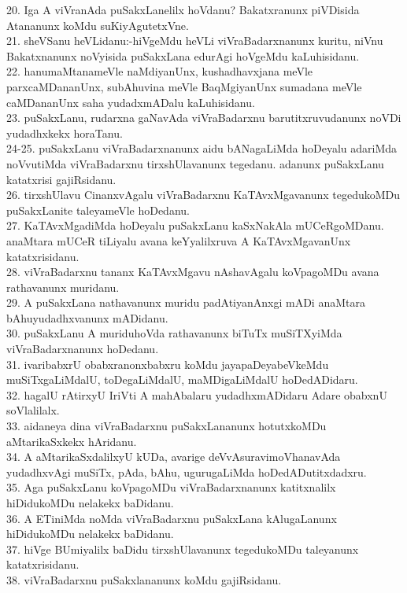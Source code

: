 \documentclass{article}
\begin{document}
20. Iga A viVranAda puSakxLanelilx hoVdanu? Bakatxranunx piVDisida Atananunx koMdu suKiyAgutetxVne.\\
21. sheVSanu heVLidanu:-hiVgeMdu heVLi viVraBadarxnanunx kuritu, niVnu Bakatxnanunx noVyisida puSakxLana edurAgi hoVgeMdu kaLuhisidanu.\\
22. hanumaMtanameVle naMdiyanUnx, kushadhavxjana meVle parxcaMDananUnx, subAhuvina meVle BaqMgiyanUnx sumadana meVle caMDananUnx saha yudadxmADalu kaLuhisidanu.\\
23. puSakxLanu, rudarxna gaNavAda viVraBadarxnu barutitxruvudanunx noVDi yudadhxkekx horaTanu.\\
24-25. puSakxLanu viVraBadarxnanunx aidu bANagaLiMda hoDeyalu adariMda noVvutiMda viVraBadarxnu tirxshUlavanunx tegedanu. adanunx puSakxLanu katatxrisi gajiRsidanu.\\
26. tirxshUlavu CinanxvAgalu viVraBadarxnu KaTAvxMgavanunx tegedukoMDu puSakxLanite taleyameVle hoDedanu.\\
27. KaTAvxMgadiMda hoDeyalu puSakxLanu kaSxNakAla mUCeRgoMDanu. anaMtara mUCeR tiLiyalu avana keYyalilxruva A KaTAvxMgavanUnx katatxrisidanu.\\
28. viVraBadarxnu tananx KaTAvxMgavu nAshavAgalu koVpagoMDu avana rathavanunx muridanu.\\
29. A puSakxLana nathavanunx muridu padAtiyanAnxgi mADi anaMtara bAhuyudadhxvanunx mADidanu.\\
30. puSakxLanu A muriduhoVda rathavanunx biTuTx muSiTXyiMda viVraBadarxnanunx hoDedanu.\\
31. ivaribabxrU obabxranonxbabxru koMdu jayapaDeyabeVkeMdu muSiTxgaLiMdalU, toDegaLiMdalU, maMDigaLiMdalU hoDedADidaru.\\
32. hagalU rAtirxyU IriVti A mahAbalaru yudadhxmADidaru Adare obabxnU soVlalilalx.\\
33. aidaneya dina viVraBadarxnu puSakxLananunx hotutxkoMDu aMtarikaSxkekx hAridanu.\\
34. A aMtarikaSxdalilxyU kUDa, avarige deVvAsuravimoVhanavAda yudadhxvAgi muSiTx, pAda, bAhu, ugurugaLiMda hoDedADutitxdadxru.\\
35. Aga puSakxLanu koVpagoMDu viVraBadarxnanunx katitxnalilx hiDidukoMDu nelakekx baDidanu.\\
36. A ETiniMda noMda viVraBadarxnu puSakxLana kAlugaLanunx hiDidukoMDu nelakekx baDidanu.\\
37. hiVge BUmiyalilx baDidu tirxshUlavanunx tegedukoMDu taleyanunx katatxrisidanu.\\
38. viVraBadarxnu puSakxlananunx koMdu gajiRsidanu.\\
\end{document}
